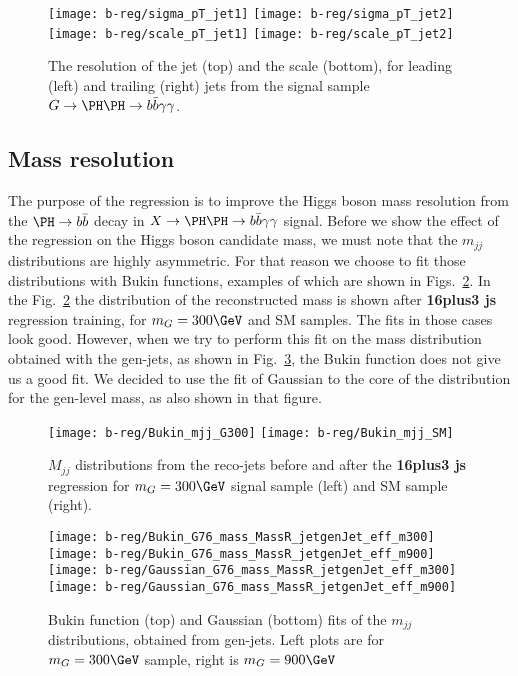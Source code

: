\begin{figure*}[bth]
  \centering
  \texttt{[image: b-reg/sigma\_pT\_jet1]}\hfil
  \texttt{[image: b-reg/sigma\_pT\_jet2]}\hfil\\
  \texttt{[image: b-reg/scale\_pT\_jet1]}\hfil
  \texttt{[image: b-reg/scale\_pT\_jet2]}\hfil\\
  \caption{The resolution of the jet \PT (top) and the scale (bottom),
    for leading (left) and trailing (right) jets from the signal
    sample $G\to\HH\to\ggbb$.}
  \label{fig:b-reg-jet-res}
\end{figure*}

\clearpage
\subsection{Mass resolution}
The purpose of the regression is to improve the Higgs boson mass
resolution from the $\Hbb$ decay in $X\to\HH\to\ggbb$ signal. Before
we show the effect of the regression on the Higgs boson candidate
mass, we must note that the $m_{jj}$ distributions are highly
asymmetric. For that reason we choose to fit those distributions with
Bukin functions, examples of which are shown in
Figs.~\ref{fig:b-reg-mH-fit-reco}.  In the
Fig.~\ref{fig:b-reg-mH-fit-reco} the distribution of the reconstructed
mass is shown after \textbf{16plus3 js} regression training, for $m_G
= 300\GeV$ and SM samples.  The fits in those cases look good.
However, when we try to perform this fit on the mass distribution
obtained with the gen-jets, as shown in
Fig.~\ref{fig:b-reg-mH-fit-gen}, the Bukin function does not give us a
good fit. We decided to use the fit of Gaussian to the core of the
distribution for the gen-level mass, as also shown in that figure.

\begin{figure*}[b]
  \centering
  \texttt{[image: b-reg/Bukin\_mjj\_G300]}\hfil
  \texttt{[image: b-reg/Bukin\_mjj\_SM]}\hfil
  \caption{$M_{jj}$ distributions from the reco-jets before and after
    the \textbf{16plus3 js} regression for $m_G=300\GeV$ signal sample
    (left) and SM sample (right).}
  \label{fig:b-reg-mH-fit-reco}
\end{figure*}

\begin{figure*}[thb]
  \centering
  \texttt{[image: b-reg/Bukin\_G76\_mass\_MassR\_jetgenJet\_eff\_m300]}\hfil
  \texttt{[image: b-reg/Bukin\_G76\_mass\_MassR\_jetgenJet\_eff\_m900]}\hfil\\
  \texttt{[image: b-reg/Gaussian\_G76\_mass\_MassR\_jetgenJet\_eff\_m300]}\hfil
  \texttt{[image: b-reg/Gaussian\_G76\_mass\_MassR\_jetgenJet\_eff\_m900]}\hfil
  \caption{Bukin function (top) and Gaussian (bottom) fits of the
    $m_{jj}$ distributions, obtained from gen-jets. Left plots are for
    $m_G=300\GeV$ sample, right is $m_G=900\GeV$}
  \label{fig:b-reg-mH-fit-gen}
\end{figure*}



